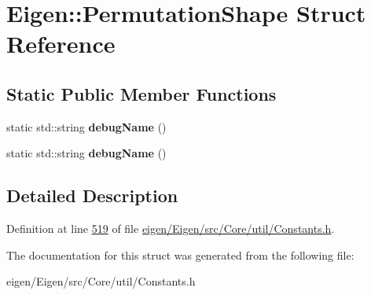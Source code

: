 \hypertarget{struct_eigen_1_1_permutation_shape}{}\section{Eigen\+:\+:Permutation\+Shape Struct Reference}
\label{struct_eigen_1_1_permutation_shape}
\subsection*{Static Public Member Functions}
\begin{DoxyCompactItemize}
\item 
\mbox{\label{struct_eigen_1_1_permutation_shape_a5e7ccddac22d76e40150fe848522b5b1}} 
static std\+::string {\bfseries debug\+Name} ()
\item 
\mbox{\label{struct_eigen_1_1_permutation_shape_a5e7ccddac22d76e40150fe848522b5b1}} 
static std\+::string {\bfseries debug\+Name} ()
\end{DoxyCompactItemize}


\subsection{Detailed Description}


Definition at line \hyperlink{eigen_2_eigen_2src_2_core_2util_2_constants_8h_source_l00519}{519} of file \hyperlink{eigen_2_eigen_2src_2_core_2util_2_constants_8h_source}{eigen/\+Eigen/src/\+Core/util/\+Constants.\+h}.



The documentation for this struct was generated from the following file\+:\begin{DoxyCompactItemize}
\item 
eigen/\+Eigen/src/\+Core/util/\+Constants.\+h\end{DoxyCompactItemize}
